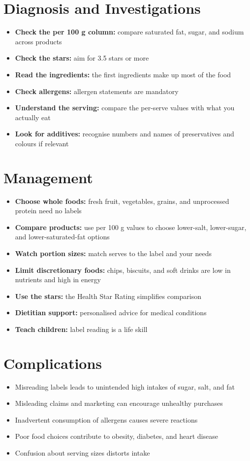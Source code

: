 \section*{Diagnosis and Investigations}
\begin{itemize}
    \item \textbf{Check the per 100 g column:} compare saturated fat, sugar, and sodium across products
    \item \textbf{Check the stars:} aim for 3.5 stars or more
    \item \textbf{Read the ingredients:} the first ingredients make up most of the food
    \item \textbf{Check allergens:} allergen statements are mandatory
    \item \textbf{Understand the serving:} compare the per-serve values with what you actually eat
    \item \textbf{Look for additives:} recognise numbers and names of preservatives and colours if relevant
\end{itemize}

\section*{Management}
\begin{itemize}
    \item \textbf{Choose whole foods:} fresh fruit, vegetables, grains, and unprocessed protein need no labels
    \item \textbf{Compare products:} use per 100 g values to choose lower-salt, lower-sugar, and lower-saturated-fat options
    \item \textbf{Watch portion sizes:} match serves to the label and your needs
    \item \textbf{Limit discretionary foods:} chips, biscuits, and soft drinks are low in nutrients and high in energy
    \item \textbf{Use the stars:} the Health Star Rating simplifies comparison
    \item \textbf{Dietitian support:} personalised advice for medical conditions
    \item \textbf{Teach children:} label reading is a life skill
\end{itemize}

\section*{Complications}
\begin{itemize}
    \item Misreading labels leads to unintended high intakes of sugar, salt, and fat
    \item Misleading claims and marketing can encourage unhealthy purchases
    \item Inadvertent consumption of allergens causes severe reactions
    \item Poor food choices contribute to obesity, diabetes, and heart disease
    \item Confusion about serving sizes distorts intake
\end{itemize}

